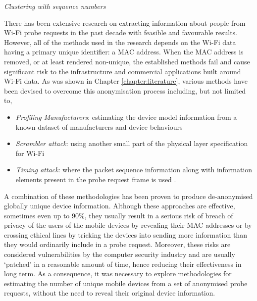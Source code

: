 \vspace{1.5em}\noindent\textit{Clustering with sequence numbers}\vspace{0.5em}

There has been extensive research on extracting information about people from Wi-Fi probe requests in the past decade with feasible and favourable results.
However, all of the methods used in the research depends on the Wi-Fi data having a primary unique identifier: a MAC address.
When the MAC address is removed, or at least rendered non-unique, the established methods fail and cause significant risk to the infrastructure and commercial applications built around Wi-Fi data.
As was shown in Chapter \ref{chapter:literature}, various methods have been devised to overcome this anonymisation process including, but not limited to,

\begin{itemize}[rightmargin=2em, leftmargin=2em]
  \itemsep-0.25cm
  \item \textit{Profiling Manufacturers}: estimating the device model information from a known dataset of manufacturers and device behaviours \citep{martin2016}
  \item \textit{Scrambler attack}: using another small part of the physical layer specification for Wi-Fi \citep{vo2016, bloessl2015}
  \item \textit{Timing attack}: where the packet sequence information along with information elements present in the probe request frame is used \citep{matte2016, cheng2016}. 
\end{itemize}

A combination of these methodologies has been proven to produce de-anonymised globally unique device information\cite[-4cm]{vanhoef2016, martin2017}.
Although these approaches are effective, sometimes even up to 90\%, they usually result in a serious risk of breach of privacy of the users of the mobile devices by revealing their MAC addresses or by crossing ethical lines by tricking the devices into sending more information than they would ordinarily include in a probe request.
Moreover, these risks are considered vulnerabilities by the computer security industry and are usually ‘patched’ in a reasonable amount of time, hence reducing their effectiveness in long term.
As a consequence, it was necessary to explore methodologies for estimating the number of unique mobile devices from a set of anonymised probe requests, without the need to reveal their original device information.

